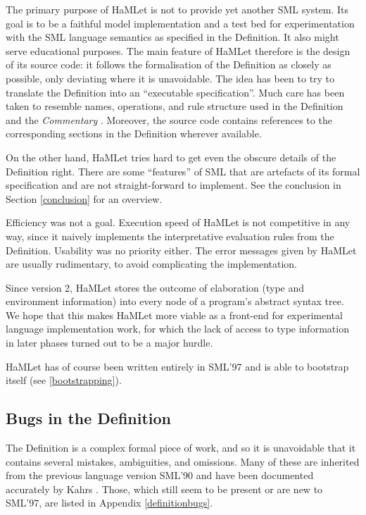 \documentclass[twoside,titlepage]{article}
\begin{document}
The primary purpose of HaMLet is not to provide yet another SML system. Its goal is to be a faithful model implementation and a test bed for experimentation with the SML language semantics as specified in the Definition. It also might serve educational purposes. The main feature of HaMLet therefore is the design of its source code: it follows the formalisation of the Definition as closely as possible, only deviating where it is unavoidable. The idea has been to try to translate the Definition into an ``executable specification''. Much care has been taken to resemble names, operations, and rule structure used in the Definition and the {\em Commentary} \cite{commentary}. Moreover, the source code contains references to the corresponding sections in the Definition wherever available.

On the other hand, HaMLet tries hard to get even the obscure details of the Definition right. There are some ``features'' of SML that are artefacts of its formal specification and are not straight-forward to implement. See the conclusion in Section \ref{conclusion} for an overview.

Efficiency was not a goal. Execution speed of HaMLet is not competitive in any way, since it naively implements the interpretative evaluation rules from the Definition. Usability was no priority either. The error messages given by HaMLet are usually rudimentary, to avoid complicating the implementation.

Since version 2, HaMLet stores the outcome of elaboration (type and environment information) into every node of a program's abstract syntax tree. We hope that this makes HaMLet more viable as a front-end for experimental language implementation work, for which the lack of access to type information in later phases turned out to be a major hurdle.

HaMLet has of course been written entirely in SML'97 and is able to bootstrap itself (see \ref{bootstrapping}).


\subsection{Bugs in the Definition}
\label{definitionbugsoverview}

The Definition is a complex formal piece of work, and so it is unavoidable that it contains several mistakes, ambiguities, and omissions. Many of these are inherited from the previous language version SML'90 \cite{definition90} and have been documented accurately by Kahrs \cite{mistakes, addenda}. Those, which still seem to be present or are new to SML'97, are listed in Appendix \ref{definitionbugs}.
\end{document}
